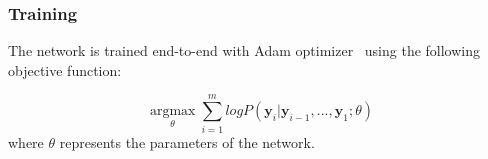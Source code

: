 \subsubsection{Training}

The network is trained end-to-end with Adam optimizer~\cite{kingma2014adam} using the following objective function:

\begin{equation} \label{Eq_LossFunction}
\mathop {\arg \max }\limits_\theta  \sum\limits_{i = 1}^m {logP({\mathbf{y}_i}|{\mathbf{y}_{i - 1}},...,{\mathbf{y}_1};\theta)} 
\end{equation}
where $\theta$ represents the parameters of the network.




%
%
%




